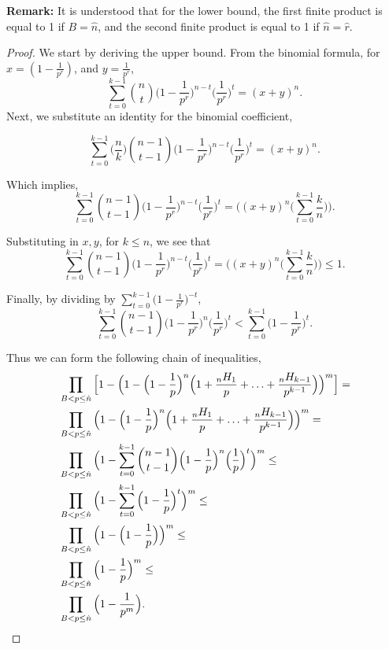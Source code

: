 \documentclass[10pt,a4paper]{article}
\begin{document}
		\noindent \textbf{Remark:} It is understood that for the lower bound, the first finite product is equal to 1 if $B = \hat{n}$, and the second finite product is equal to 1 if $\hat{n}=\hat{r}$.
		\newline
		
		\begin{proof}
			We start by deriving the upper bound. 
			From the binomial formula, for $x=(1-\frac{1}{p^r})$, and $y=\frac{1}{p^r}$,
			$$\sum_{t=0}^{k-1}\binom{n}{t}\Big(1-\frac{1}{p^r}\Big)^{n-t}\Big(\frac{1}{p^r}\Big)^t=(x+y)^n.$$
			Next, we substitute an identity for the binomial coefficient,
			
			$$\sum_{t=0}^{k-1}\Big(\frac{n}{k}\Big)\binom{n-1}{t-1}\Big(1-\frac{1}{p^r}\Big)^{n-t}\Big(\frac{1}{p^r}\Big)^t=(x+y)^n.$$
			
			Which implies, 
			$$\sum_{t=0}^{k-1}\binom{n-1}{t-1}\Big(1-\frac{1}{p^r}\Big)^{n-t}\Big(\frac{1}{p^r}\Big)^t=\Big((x+y)^n\Big(\sum_{t=0}^{k-1}\frac{k}{n}\Big)\Big).$$
			
			Substituting in $x,y$, for $k\leq n$, we see that 
			$$\sum_{t=0}^{k-1}\binom{n-1}{t-1}\Big(1-\frac{1}{p^r}\Big)^{n-t}\Big(\frac{1}{p^r}\Big)^t=\Big((x+y)^n\Big(\sum_{t=0}^{k-1}\frac{k}{n}\Big)\Big)\leq1.$$
			
			Finally, by dividing by $\sum_{t=0}^{k-1}\Big(1-\frac{1}{p^r}\Big)^{-t}$, 
			$$\sum_{t=0}^{k-1}\binom{n-1}{t-1}\Big(1-\frac{1}{p^r}\Big)^{n}\Big(\frac{1}{p^r}\Big)^t<\sum_{t=0}^{k-1}\Big(1-\frac{1}{p^r}\Big)^t.$$
			
			Thus we can form the following chain of inequalities,
			\begin{align*}
				&\prod_{B<p\leq\hat{n}} \Big[1 - \Big(1 -\Big(1-\frac{1}{p}\Big)^n\Big(1+\frac{{}_nH_1}{p}+\mathellipsis+\frac{{}_nH_{k-1}}{p^{k-1}}\Big)\Big)^m\Big] = \\
				&\prod_{B<p\leq\hat{n}} \Big(1 -\Big(1-\frac{1}{p}\Big)^n\Big(1+\frac{{}_nH_1}{p}+\mathellipsis+\frac{{}_nH_{k-1}}{p^{k-1}}\Big)\Big)^m = \\
				&\prod_{B<p\leq\hat{n}} \Big(1 - \sum_{t=0}^{k-1}\binom{n-1}{t-1}\Big(1-\frac{1}{p}\Big)^n\Big(\frac{1}{p}\Big)^t\Big)^m \leq \\
				&\prod_{B<p\leq\hat{n}} \Big(1 - \sum_{t=0}^{k-1}\Big(1-\frac{1}{p}\Big)^t\Big)^m \leq \\
				&\prod_{B<p\leq\hat{n}} \Big(1 - \Big(1-\frac{1}{p}\Big)\Big)^m \leq \\
				&\prod_{B<p\leq\hat{n}} \Big(1-\frac{1}{p}\Big)^m \leq \\
				&\prod_{B<p\leq\hat{n}} \Big(1-\frac{1}{p^m}\Big). \\
			\end{align*}
			

\end{proof}
\end{document}

